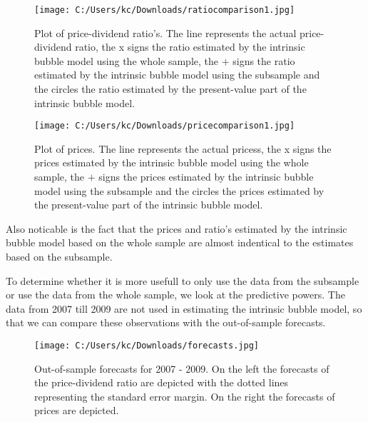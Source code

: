 \documentclass{article}
\begin{document}
\begin{figure}[h]
	\centering
		\texttt{[image: C:/Users/kc/Downloads/ratiocomparison1.jpg]}
	\caption{Plot of price-dividend ratio's. The line represents the actual price-dividend ratio, the x signs the ratio estimated by the intrinsic bubble model using the whole sample, the $+$ signs the ratio estimated by the intrinsic bubble model using the subsample and the circles the ratio estimated by the present-value part of the intrinsic bubble model.}
	\label{rationls}
\end{figure}
 
\begin{figure}
	\centering
		\texttt{[image: C:/Users/kc/Downloads/pricecomparison1.jpg]}
	\caption{Plot of prices. The line represents the actual pricess, the x signs the prices estimated by the intrinsic bubble model using the whole sample, the $+$ signs the prices estimated by the intrinsic bubble model using the subsample and the circles the prices estimated by the present-value part of the intrinsic bubble model.}
	\label{pricenls}
\end{figure}

Also noticable is the fact that the prices and ratio's estimated by the intrinsic bubble model based on the whole sample are almost indentical to the estimates based on the subsample.


To determine whether it is more usefull to only use the data from the subsample or use the data from the whole sample, we look at the predictive powers. The data from 2007 till 2009 are not used in estimating the intrinsic bubble model, so that we can compare these observations with the out-of-sample forecasts. 

\begin{figure}
	\centering
		\texttt{[image: C:/Users/kc/Downloads/forecasts.jpg]}
	\caption{Out-of-sample forecasts for 2007 - 2009. On the left the forecasts of the price-dividend ratio are depicted with the dotted lines representing the standard error margin. On the right the forecasts of prices are depicted.}
	\label{forecasts}
\end{figure}
 
\end{document}
